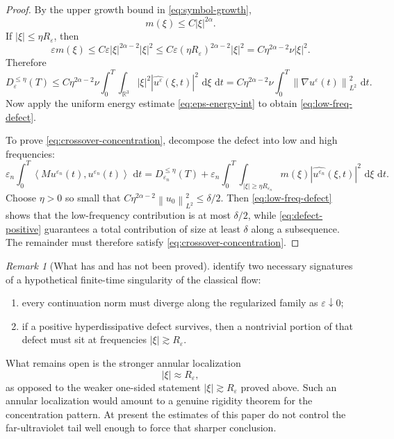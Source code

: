 \documentclass[11pt]{article}
\theoremstyle{definition}
\theoremstyle{remark}
\newtheorem{remark}[theorem]{Remark}
\newcommand{\R}{\mathbb{R}}
\newcommand{\dd}{\,\mathrm{d}}
\newcommand{\ip}[2]{\left\langle #1,#2\right\rangle}
\newcommand{\norm}[1]{\left\lVert #1\right\rVert}
\begin{document}
\begin{proof}
By the upper growth bound in \eqref{eq:symbol-growth},
\[
m(\xi)\le C|\xi|^{2\alpha}.
\]
If $|\xi|\le \eta R_\varepsilon$, then
\[
\varepsilon m(\xi)
\le C\varepsilon |\xi|^{2\alpha-2}|\xi|^2
\le C\varepsilon (\eta R_\varepsilon)^{2\alpha-2}|\xi|^2
= C\eta^{2\alpha-2}\nu |\xi|^2.
\]
Therefore
\[
D^{\le \eta}_\varepsilon(T)
\le C\eta^{2\alpha-2}\nu \int_0^T\int_{\R^3}|\xi|^2|\widehat{u^\varepsilon}(\xi,t)|^2\,\dd\xi\,\dd t
= C\eta^{2\alpha-2}\nu\int_0^T\norm{\nabla u^\varepsilon(t)}_{L^2}^2\,\dd t.
\]
Now apply the uniform energy estimate \eqref{eq:eps-energy-int} to obtain \eqref{eq:low-freq-defect}.

To prove \eqref{eq:crossover-concentration}, decompose the defect into low and high frequencies:
\[
\varepsilon_n\int_0^T\ip{M u^{\varepsilon_n}(t)}{u^{\varepsilon_n}(t)}\,\dd t
= D^{\le \eta}_{\varepsilon_n}(T)
+\varepsilon_n\int_0^T\int_{|\xi|\ge \eta R_{\varepsilon_n}} m(\xi)|\widehat{u^{\varepsilon_n}}(\xi,t)|^2\,\dd\xi\,\dd t.
\]
Choose $\eta>0$ so small that $C\eta^{2\alpha-2}\norm{u_0}_{L^2}^2\le \delta/2$. Then \eqref{eq:low-freq-defect} shows that the low-frequency contribution is at most $\delta/2$, while \eqref{eq:defect-positive} guarantees a total contribution of size at least $\delta$ along a subsequence. The remainder must therefore satisfy \eqref{eq:crossover-concentration}.
\end{proof}

\begin{remark}[What has and has not been proved]\label{rem:rigid-concentration}
 identify two necessary signatures of a hypothetical finite-time singularity of the classical flow:
\begin{enumerate}[label=(\roman*)]
\item every continuation norm must diverge along the regularized family as $\varepsilon\downarrow0$;
\item if a positive hyperdissipative defect survives, then a nontrivial portion of that defect must sit at frequencies $|\xi|\gtrsim R_\varepsilon$.
\end{enumerate}
What remains open is the stronger annular localization
\[
|\xi|\approx R_\varepsilon,
\]
as opposed to the weaker one-sided statement $|\xi|\gtrsim R_\varepsilon$ proved above. Such an annular localization would amount to a genuine rigidity theorem for the concentration pattern. At present the estimates of this paper do not control the far-ultraviolet tail well enough to force that sharper conclusion.
\end{remark}
\end{document}

